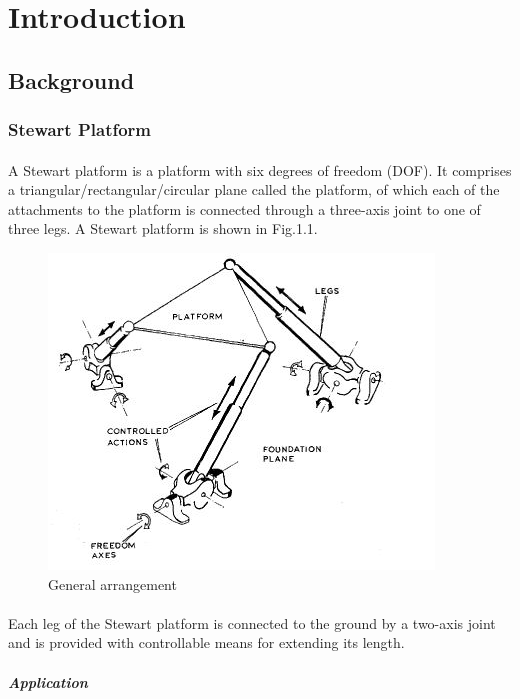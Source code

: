 \section{Introduction}
\label{sec:introduction}
\subsection{Background}
\subsubsection{Stewart Platform}
\paragraph{}A Stewart platform is a platform with six degrees of freedom (DOF).
\cite{stewart1965platform} It comprises a triangular/rectangular/circular plane called the platform, of which each of the attachments to the platform is connected through a three-axis joint to one of three legs.
A Stewart platform is shown in Fig.1.1.
\begin{center}
	\begin{figure}[!h]
	\centering
	\includegraphics{Figures/Fig1}
	\caption{General arrangement}
	\end{figure}
\end{center}
\paragraph{}Each leg of the Stewart platform is connected to the ground by a two-axis joint and is provided with controllable means for extending its length.
\subparagraph{Application}
